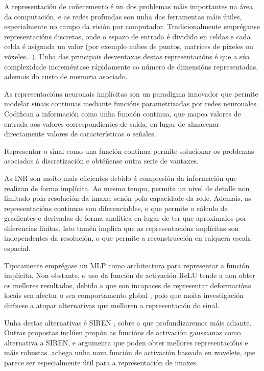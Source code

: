 A representación de coñecemento é un dos problemas máis importantes na área da computación, e as 
redes profundas son unha das ferramentas máis útiles, especialmente no campo da visión por computador.
Tradicionalmente empréganse representacións discretas, onde o espazo de entrada é dividido en celdas e cada celda é asignada un valor (por exemplo nubes de puntos, matrices de píxeles ou vóxeles...).
Unha das principais desventaxas destas representacións é que a súa complexidade increméntase rápidamente co número de dimensións representadas, ademais do custo de memoria asociado.

 As representacións neuronais implícitas son un paradigma innovador que permite modelar sinais continuas mediante funcións parametrizadas por redes neuronales.
 Codifican a información como unha función continua, que mapea valores de entrada aos valores correspondientes de saída, en lugar de almacenar directamente valores de características o señales.

Representar o sinal como una función continua permite solucionar os problemas asociados á discretización e obtéñense outra serie de vantaxes.

As INR son moito mais eficientes debido á compresión da información que realizan de forma implícita. Ao mesmo tempo, permite un nivel de detalle non limitado pola resolución da imaxe, senón pola capacidade da rede. 
 Ademais, as representacións continuas son diferenciables, o que permite o cálculo de gradientes e derivadas de forma analítica en lugar de ter que aproximalos por diferencias finitas.
 Isto tamén implica que as representacións implícitas son independentes da resolución, o que permite a reconstrucción en calquera escala espacial.
 
Tipicamente emprégase un MLP como architectura para representar a función implícita. Non obstante, o uso da función de activación ReLU tende a non obter os mellores resultados, debido a que son incapaces de representar deformacións locais sen afectar o sea comportamento global \cite{rahaman2019spectralbiasneuralnetworks},
polo que moita investigación diríxese a atopar alternativas que melloren a representación do sinal. \cite{essakine2024standimplicitneuralrepresentations}

Unha destas alternativas é SIREN \cite{sitzmann2020implicitneuralrepresentationsperiodic}, sobre a que profundizaremos máis adiante.
Outras propostas inclúen \cite{ramasinghe2022periodicityunifyingframeworkactivations} propón as funcións de activación gaussianas como alternativa a SIREN, e argumenta que poden obter mellores representacións e máis robustas.
\cite{saragadam2023wirewaveletimplicitneural} achega unha nova función de activación baseada en wavelets, que parece ser especialmente útil para a representación de imaxes.

